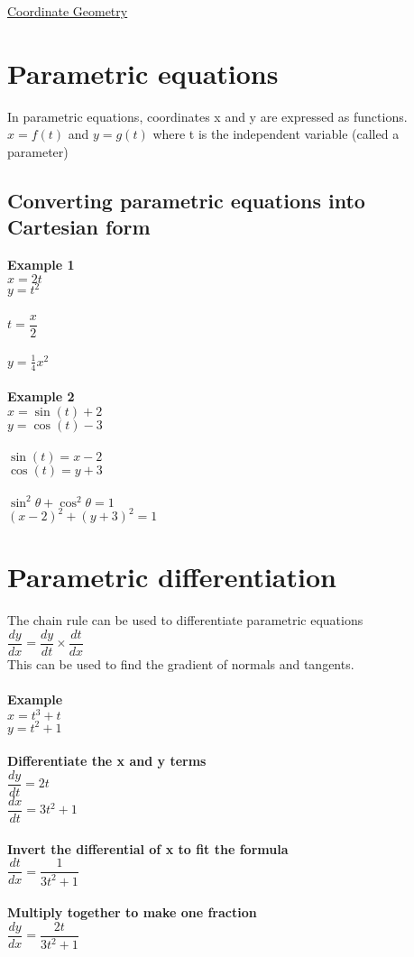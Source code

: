 \documentclass{article}[18pt]
\begin{document}
\begin{center}
\underline{\huge Coordinate Geometry}
\end{center}
\section{Parametric equations}
In parametric equations, coordinates x and y are expressed as functions.\\
$x=f(t)$ and $y=g(t)$ where t is the independent variable (called a parameter)
\subsection{Converting parametric equations into Cartesian form}
\textbf{Example 1}\\
$x=2t$\\
$y=t^2$\\
\\
$t=\dfrac{x}{2}$\\
\\
$y=\frac{1}{4}x^2$\\
\\
\textbf{Example 2}\\
$x=\sin(t)+2$\\
$y=\cos(t)-3$\\
\\
$\sin(t)=x-2$\\
$\cos(t)=y+3$\\
\\
$\sin^2\theta+\cos^2\theta=1$\\
$(x-2)^2+(y+3)^2=1$
\section{Parametric differentiation}
The chain rule can be used to differentiate parametric equations\\
$\dfrac{dy}{dx}=\dfrac{dy}{dt}\times\dfrac{dt}{dx}$\\
This can be used to find the gradient of normals and tangents.\\
\\
\textbf{Example}\\
$x=t^3+t$\\
$y=t^2+1$\\
\\
\textbf{Differentiate the x and y terms}\\
$\dfrac{dy}{dt}=2t$\\
$\dfrac{dx}{dt}=3t^2+1$\\
\\
\textbf{Invert the differential of x to fit the formula}\\
$\dfrac{dt}{dx}=\dfrac{1}{3t^2+1}$\\
\\
\textbf{Multiply together to make one fraction}\\
$\dfrac{dy}{dx}=\dfrac{2t}{3t^2+1}$
\end{document}
